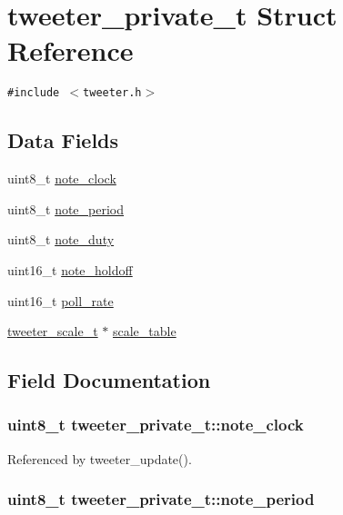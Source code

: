 \hypertarget{structtweeter__private__t}{
\section{tweeter\_\-private\_\-t Struct Reference}
\label{structtweeter__private__t}
}
{\tt \#include $<$tweeter.h$>$}

\subsection*{Data Fields}
\begin{CompactItemize}
\item 
uint8\_\-t \hyperlink{structtweeter__private__t_fd51e6e2dfb1f2f17f22742856dd9a9e}{note\_\-clock}
\item 
uint8\_\-t \hyperlink{structtweeter__private__t_357b8bbcf21350dc1d7f9db74343a70d}{note\_\-period}
\item 
uint8\_\-t \hyperlink{structtweeter__private__t_77716ab615ed0b7329eed4a34954909c}{note\_\-duty}
\item 
uint16\_\-t \hyperlink{structtweeter__private__t_ceca772041b6209a767e344be8199fee}{note\_\-holdoff}
\item 
uint16\_\-t \hyperlink{structtweeter__private__t_75cdc2f5578d5afb3d344857141a0365}{poll\_\-rate}
\item 
\hyperlink{tweeter_8h_da6af92a2e18e4a3164626709a43a5f6}{tweeter\_\-scale\_\-t} $\ast$ \hyperlink{structtweeter__private__t_f64d174bb3290138155e8278d5d6ec1e}{scale\_\-table}
\end{CompactItemize}


\subsection{Field Documentation}
\hypertarget{structtweeter__private__t_fd51e6e2dfb1f2f17f22742856dd9a9e}{
\subsubsection{\setlength{\rightskip}{0pt plus 5cm}uint8\_\-t {\bf tweeter\_\-private\_\-t::note\_\-clock}}}
\label{structtweeter__private__t_fd51e6e2dfb1f2f17f22742856dd9a9e}




Referenced by tweeter\_\-update().\hypertarget{structtweeter__private__t_357b8bbcf21350dc1d7f9db74343a70d}{
\subsubsection{\setlength{\rightskip}{0pt plus 5cm}uint8\_\-t {\bf tweeter\_\-private\_\-t::note\_\-period}}}
\label{structtweeter__private__t_357b8bbcf21350dc1d7f9db74343a70d}




